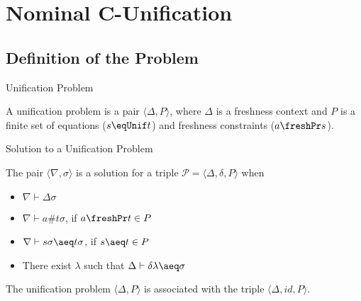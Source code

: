 \section{Nominal C-Unification}
\subsection{Definition of the Problem}
\begin{frame}{Unification Problem}
    \begin{definition} 
        A unification problem is a pair $\langle \Delta, P \rangle$, where $\Delta$ is 
        a freshness context and $P$ is a finite set of equations ($s \eqUnif t$) and freshness
        constraints ($a \freshPr s$).
    \end{definition}
\end{frame}

\begin{frame}{Solution to a Unification Problem} 
    \begin{definition}
        The pair $\langle \nabla, \sigma \rangle$ is a 
        solution for a triple $\mathcal{P} = \langle \Delta, \delta, P \rangle$ when
        \begin{itemize}
            \item $\nabla \vdash \Delta \sigma$
            \item $\nabla \vdash a\#t\sigma$, if $a\freshPr t \in P$
            \item $\nabla \vdash s\sigma \aeq t\sigma$, if $s \aeq t \in P$ 
            \item There exist $\lambda$ such that $\Delta \vdash \delta\lambda \aeq
                \sigma$
        \end{itemize}
    \end{definition}
    The unification problem $\langle \Delta, P \rangle$ is associated with the triple 
    $\langle \Delta, id, P \rangle$.
\end{frame}


